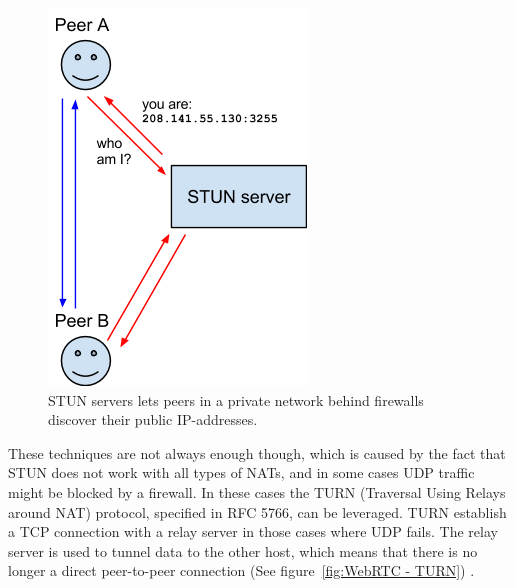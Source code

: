 \begin{figure}[htp]
\centering
\includegraphics[width=\textwidth,height=0.2\paperheight,keepaspectratio
]{figures/webrtc-stun}
\caption{STUN servers lets peers in a private network behind firewalls discover their public IP-addresses\cite{WebRTCArchitecture:2014:Online}.}
\label{fig:WebRTC - STUN}
\end{figure}

These techniques are not always enough though, which is caused by the fact that STUN does not work with all types of NATs, and in some cases UDP traffic might be blocked by a firewall. In these cases the TURN (Traversal Using Relays around NAT) protocol, specified in RFC 5766, can be leveraged.  TURN establish a TCP connection with a relay server in those cases where UDP fails. The relay server is used to tunnel data to the other host, which means that there is no longer a direct peer-to-peer connection (See figure~\ref{fig:WebRTC - TURN}) \cite{RFC5766:Online}.

